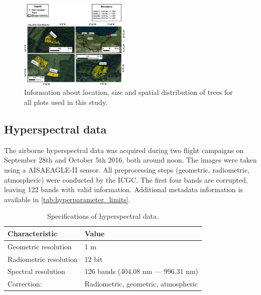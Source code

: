 \documentclass[letterpaper, peerreview]{IEEEtran}
\begin{document}
\begin{figure} [t!]
	\begin{center}
		\centering
		\includegraphics[width=0.48\textwidth] {study-area-hyperspectral.pdf}
		\caption{Information about location, size and spatial distribution of trees for all plots used in this study.}\label{fig:study_area}
	\end{center}
\end{figure}



\subsection{Hyperspectral data}

\noindent The airborne hyperspectral data was acquired during two flight campaigns on September 28th and October 5th 2016, both around noon.
The images were taken using a AISAEAGLE-II sensor.
All preprocessing steps (geometric, radiometric, atmospheric) were conducted by the \ac{ICGC}.
The first four bands are corrupted, leaving 122 bands with valid information.
Additional metadata information is available in \autoref{tab:hyperparameter_limits}.


\begin{table}[t]
\centering
\caption[t]{Specifications of hyperspectral data.}
\begingroup
\begin{tabular}{ll}
	\\
	Characteristic         & Value                               \\
	\toprule
	Geometric resolution   & 1 m                                 \\
	Radiometric resolution & 12 bit                              \\
	Spectral resolution    & 126 bands (404.08 nm --- 996.31 nm) \\
	Correction:            & Radiometric, geometric, atmospheric
\end{tabular}
\endgroup\label{tab:hyperparameter_limits}
\end{table}
\end{document}

